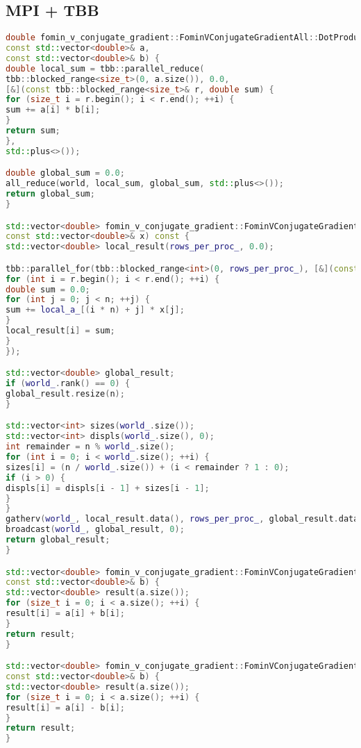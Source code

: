 \documentclass[12pt]{article}
\begin{document}
\subsection*{MPI + TBB}
\begin{lstlisting}[language=C++]
double fomin_v_conjugate_gradient::FominVConjugateGradientAll::DotProduct(const boost::mpi::communicator& world,
const std::vector<double>& a,
const std::vector<double>& b) {
double local_sum = tbb::parallel_reduce(
tbb::blocked_range<size_t>(0, a.size()), 0.0,
[&](const tbb::blocked_range<size_t>& r, double sum) {
for (size_t i = r.begin(); i < r.end(); ++i) {
sum += a[i] * b[i];
}
return sum;
},
std::plus<>());

double global_sum = 0.0;
all_reduce(world, local_sum, global_sum, std::plus<>());
return global_sum;
}

std::vector<double> fomin_v_conjugate_gradient::FominVConjugateGradientAll::MatrixVectorMultiply(
const std::vector<double>& x) const {
std::vector<double> local_result(rows_per_proc_, 0.0);

tbb::parallel_for(tbb::blocked_range<int>(0, rows_per_proc_), [&](const tbb::blocked_range<int>& r) {
for (int i = r.begin(); i < r.end(); ++i) {
double sum = 0.0;
for (int j = 0; j < n; ++j) {
sum += local_a_[(i * n) + j] * x[j];
}
local_result[i] = sum;
}
});

std::vector<double> global_result;
if (world_.rank() == 0) {
global_result.resize(n);
}

std::vector<int> sizes(world_.size());
std::vector<int> displs(world_.size(), 0);
int remainder = n % world_.size();
for (int i = 0; i < world_.size(); ++i) {
sizes[i] = (n / world_.size()) + (i < remainder ? 1 : 0);
if (i > 0) {
displs[i] = displs[i - 1] + sizes[i - 1];
}
}
gatherv(world_, local_result.data(), rows_per_proc_, global_result.data(), sizes, displs, 0);
broadcast(world_, global_result, 0);
return global_result;
}

std::vector<double> fomin_v_conjugate_gradient::FominVConjugateGradientAll::VectorAdd(const std::vector<double>& a,
const std::vector<double>& b) {
std::vector<double> result(a.size());
for (size_t i = 0; i < a.size(); ++i) {
result[i] = a[i] + b[i];
}
return result;
}

std::vector<double> fomin_v_conjugate_gradient::FominVConjugateGradientAll::VectorSub(const std::vector<double>& a,
const std::vector<double>& b) {
std::vector<double> result(a.size());
for (size_t i = 0; i < a.size(); ++i) {
result[i] = a[i] - b[i];
}
return result;
}


\end{lstlisting}
\end{document}
